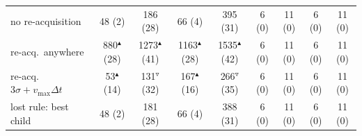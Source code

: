 \begin{table}[t]
\begin{tabular}{lcccccccc}
no re-acquisition & 48 (2) & 186 (28) & 66 (4) & 395 (31) & 6 (0) & 11 (0) & 6 (0) & 11 (0) \\
re-acq.\ anywhere & 880$^\blacktriangle$ (28) & 1273$^\blacktriangle$ (41) & 1163$^\blacktriangle$ (28) & 1535$^\blacktriangle$ (42) & 6 (0) & 11 (0) & 6 (0) & 11 (0) \\
re-acq.\ $3\sigma+v_{\max}\Delta t$ & 53$^\blacktriangle$ (14) & 131$^\triangledown$ (32) & 167$^\blacktriangle$ (16) & 266$^\triangledown$ (35) & 6 (0) & 11 (0) & 6 (0) & 11 (0) \\
lost rule: best child & 48 (2) & 181 (28) & 66 (4) & 388 (31) & 6 (0) & 11 (0) & 6 (0) & 11 (0) \\
\bottomrule
\end{tabular}
\end{table}
